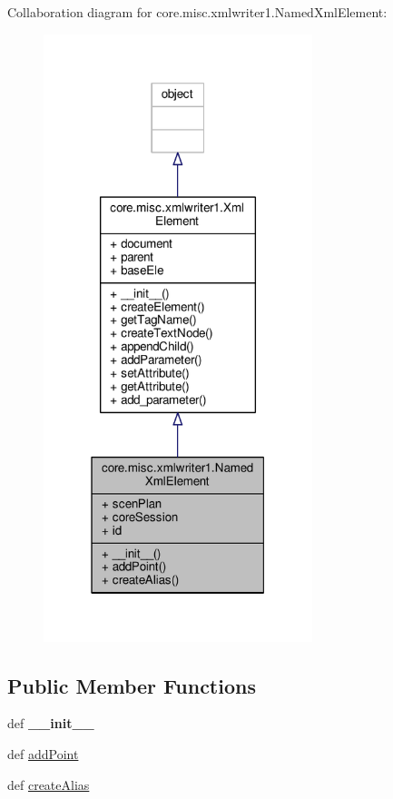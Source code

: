 Collaboration diagram for core.\+misc.\+xmlwriter1.\+Named\+Xml\+Element\+:
\nopagebreak
\begin{figure}[H]
\begin{center}
\leavevmode
\includegraphics[width=222pt]{classcore_1_1misc_1_1xmlwriter1_1_1_named_xml_element__coll__graph}
\end{center}
\end{figure}
\subsection*{Public Member Functions}
\begin{DoxyCompactItemize}
\item 
\hypertarget{classcore_1_1misc_1_1xmlwriter1_1_1_named_xml_element_aac4d55e2654ad9e6ff37c6acfe7b16e3}{def {\bfseries \+\_\+\+\_\+init\+\_\+\+\_\+}}\label{classcore_1_1misc_1_1xmlwriter1_1_1_named_xml_element_aac4d55e2654ad9e6ff37c6acfe7b16e3}

\item 
def \hyperlink{classcore_1_1misc_1_1xmlwriter1_1_1_named_xml_element_affd2a5411e2b0840f0af2b73d18f9318}{add\+Point}
\item 
def \hyperlink{classcore_1_1misc_1_1xmlwriter1_1_1_named_xml_element_aa7c5bcce3bd61425021222ebe0675a9d}{create\+Alias}
\end{DoxyCompactItemize}
